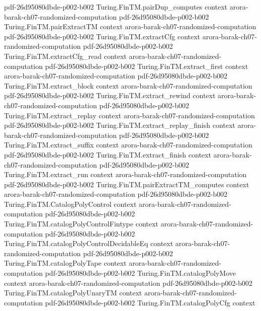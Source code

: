 \begin{theorem}
  {pdf-26d95080dbde-p002-b002}
\proofstep
  {Turing.FinTM.pairDup_computes}
  {context}
  {arora-barak-ch07-randomized-computation}
  {pdf-26d95080dbde-p002-b002}
\proofstep
  {Turing.FinTM.pairExtractTM}
  {context}
  {arora-barak-ch07-randomized-computation}
  {pdf-26d95080dbde-p002-b002}
\proofstep
  {Turing.FinTM.extractCfg}
  {context}
  {arora-barak-ch07-randomized-computation}
  {pdf-26d95080dbde-p002-b002}
\proofstep
  {Turing.FinTM.extractCfg_read}
  {context}
  {arora-barak-ch07-randomized-computation}
  {pdf-26d95080dbde-p002-b002}
\proofstep
  {Turing.FinTM.extract_first}
  {context}
  {arora-barak-ch07-randomized-computation}
  {pdf-26d95080dbde-p002-b002}
\proofstep
  {Turing.FinTM.extract_block}
  {context}
  {arora-barak-ch07-randomized-computation}
  {pdf-26d95080dbde-p002-b002}
\proofstep
  {Turing.FinTM.extract_rewind}
  {context}
  {arora-barak-ch07-randomized-computation}
  {pdf-26d95080dbde-p002-b002}
\proofstep
  {Turing.FinTM.extract_replay}
  {context}
  {arora-barak-ch07-randomized-computation}
  {pdf-26d95080dbde-p002-b002}
\proofstep
  {Turing.FinTM.extract_replay_finish}
  {context}
  {arora-barak-ch07-randomized-computation}
  {pdf-26d95080dbde-p002-b002}
\proofstep
  {Turing.FinTM.extract_suffix}
  {context}
  {arora-barak-ch07-randomized-computation}
  {pdf-26d95080dbde-p002-b002}
\proofstep
  {Turing.FinTM.extract_finish}
  {context}
  {arora-barak-ch07-randomized-computation}
  {pdf-26d95080dbde-p002-b002}
\proofstep
  {Turing.FinTM.extract_run}
  {context}
  {arora-barak-ch07-randomized-computation}
  {pdf-26d95080dbde-p002-b002}
\proofstep
  {Turing.FinTM.pairExtractTM_computes}
  {context}
  {arora-barak-ch07-randomized-computation}
  {pdf-26d95080dbde-p002-b002}
\proofstep
  {Turing.FinTM.CatalogPolyControl}
  {context}
  {arora-barak-ch07-randomized-computation}
  {pdf-26d95080dbde-p002-b002}
\proofstep
  {Turing.FinTM.catalogPolyControlFintype}
  {context}
  {arora-barak-ch07-randomized-computation}
  {pdf-26d95080dbde-p002-b002}
\proofstep
  {Turing.FinTM.catalogPolyControlDecidableEq}
  {context}
  {arora-barak-ch07-randomized-computation}
  {pdf-26d95080dbde-p002-b002}
\proofstep
  {Turing.FinTM.catalogPolyTape}
  {context}
  {arora-barak-ch07-randomized-computation}
  {pdf-26d95080dbde-p002-b002}
\proofstep
  {Turing.FinTM.catalogPolyMove}
  {context}
  {arora-barak-ch07-randomized-computation}
  {pdf-26d95080dbde-p002-b002}
\proofstep
  {Turing.FinTM.catalogPolyUnaryTM}
  {context}
  {arora-barak-ch07-randomized-computation}
  {pdf-26d95080dbde-p002-b002}
\proofstep
  {Turing.FinTM.catalogPolyCfg}
  {context}

\end{theorem}
